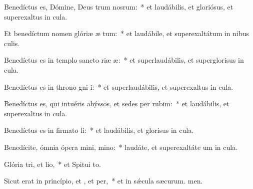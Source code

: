 \item Benedíctus es, Dómine, Deus trum nosrum:~* et laudábilis, et gloriósus, et superexaltus in cula.

\item Et benedíctum nomen glóriæ æ tum:~* et laudábile, et superexaltátum in nibus culis.

\item Benedíctus es in templo sancto riæ æ:~* et superlaudábilis, et superglorisus in cula.

\item Benedíctus es in throno gni i:~* et superlaudábilis, et superexaltus in cula.

\item Benedíctus es, qui intuéris abýssos, et sedes per rubim:~* et laudábilis, et superexaltus in cula.

\item Benedíctus es in firmato li:~* et laudábilis, et glorisus in cula.

\item Benedícite, ómnia ópera mini, mino:~* laudáte, et superexaltáte um in cula.

\item Glória tri, et lio,~* et Spitui to.

\item Sicut erat in princípio, et , et per,~* et in sǽcula sæcurum. men.